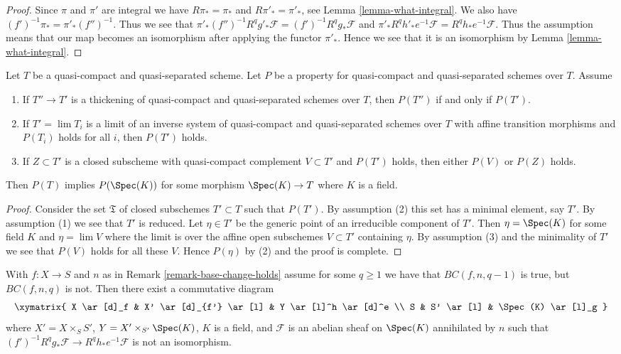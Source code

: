 \begin{proof}
Since $\pi$ and $\pi'$ are integral we have $R\pi_* = \pi_*$ and
$R\pi'_* = \pi'_*$, see Lemma \ref{lemma-what-integral}.
We also have $(f')^{-1}\pi_* = \pi'_*(f'')^{-1}$. Thus we see that
$\pi'_*(f'')^{-1}R^qg'_*\mathcal{F} = (f')^{-1}R^qg_*\mathcal{F}$
and
$\pi'_*R^qh'_*e^{-1}\mathcal{F} = R^qh_*e^{-1}\mathcal{F}$.
Thus the assumption means that our map becomes an
isomorphism after applying the functor $\pi'_*$.
Hence we see that it is an isomorphism by Lemma \ref{lemma-what-integral}.
\end{proof}

\begin{lemma}
\label{lemma-formal-argument}
Let $T$ be a quasi-compact and quasi-separated scheme.
Let $P$ be a property for quasi-compact and quasi-separated
schemes over $T$. Assume
\begin{enumerate}
\item If $T'' \to T'$ is a thickening of quasi-compact and
quasi-separated schemes over $T$, then $P(T'')$ if and only if $P(T')$.
\item If $T' = \lim T_i$ is a limit of an inverse system of
quasi-compact and quasi-separated schemes over $T$ with affine
transition morphisms and $P(T_i)$ holds for all $i$, then
$P(T')$ holds.
\item If $Z \subset T'$ is a closed subscheme with
quasi-compact complement $V \subset T'$ and $P(T')$ holds,
then either $P(V)$ or $P(Z)$ holds.
\end{enumerate}
Then $P(T)$ implies $P(\Spec(K))$ for some morphism $\Spec(K) \to T$
where $K$ is a field.
\end{lemma}

\begin{proof}
Consider the set $\mathfrak T$ of closed subschemes $T' \subset T$
such that $P(T')$. By assumption (2) this set has a minimal element,
say $T'$. By assumption (1) we see that $T'$ is reduced.
Let $\eta \in T'$ be the generic point of an irreducible
component of $T'$. Then $\eta = \Spec(K)$ for some field
$K$ and $\eta = \lim V$ where the limit is over the affine
open subschemes $V \subset T'$ containing $\eta$.
By assumption (3) and the minimality of $T'$ we see
that $P(V)$ holds for all these $V$. Hence $P(\eta)$
by (2) and the proof is complete.
\end{proof}

\begin{lemma}
\label{lemma-base-change-does-not-hold-pre}
With $f : X \to S$ and $n$ as in Remark \ref{remark-base-change-holds}
assume for some $q \geq 1$ we have that $BC(f, n, q - 1)$ is true, but
$BC(f, n, q)$ is not. Then there exist a commutative diagram
$$
\xymatrix{
X \ar[d]_f & X' \ar[d]_{f'} \ar[l] & Y \ar[l]^h \ar[d]^e \\
S & S' \ar[l] & \Spec(K) \ar[l]_g
}
$$
where $X' = X \times_S S'$, $Y = X' \times_{S'} \Spec(K)$,
$K$ is a field, and $\mathcal{F}$ is an abelian sheaf
on $\Spec(K)$ annihilated by $n$ such that
$(f')^{-1}R^qg_*\mathcal{F} \to R^qh_*e^{-1}\mathcal{F}$
is not an isomorphism.
\end{lemma}

